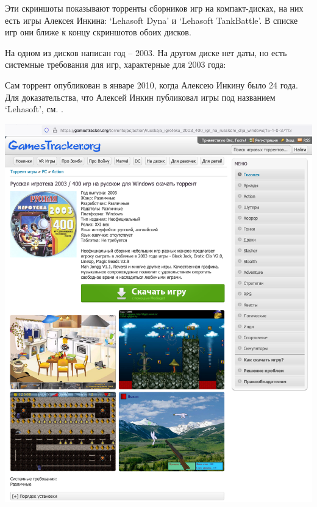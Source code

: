 
Эти скриншоты показывают торренты сборников игр на компакт-дисках,
на них есть игры Алексея Инкина: `Lehasoft Dyna' и `Lehasoft TankBattle'.
В списке игр они ближе к концу скриншотов
обоих дисков.

На одном из дисков написан год -- 2003.
На другом диске нет даты, но есть системные требования для игр,
характерные для 2003 года:


Сам торрент опубликован в январе 2010, когда Алексею Инкину было 24 года.
Для доказательства, что Алексей Инкин публиковал игры под названием `Lehasoft', см. .



\begin{center}
    \includegraphics[width=\textwidth]{igroteka-p1}
\end{center}
\WillContinue
\pagebreak

